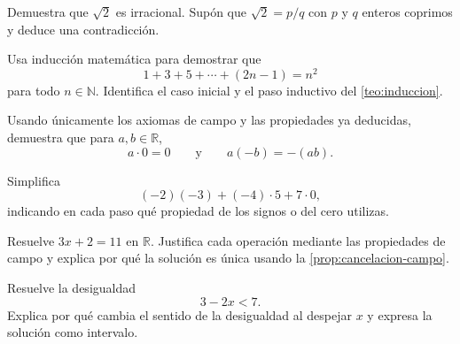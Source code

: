\begin{samepage}
\begin{problem}
Demuestra que $\sqrt2$ es irracional. Supón que $\sqrt2=p/q$ con $p$ y $q$ enteros coprimos y deduce una contradicción.
\end{problem}
\end{samepage}
\par{}

\begin{samepage}
\begin{problem}
Usa inducción matemática para demostrar que
\[
1+3+5+\cdots +(2n-1)=n^2
\]
para todo $n\in\mathbb{N}$.
Identifica el caso inicial y el paso inductivo del \cref{teo:induccion}.
\end{problem}
\end{samepage}
\par{}

\begin{samepage}
\begin{problem}
Usando únicamente los axiomas de campo y las propiedades ya deducidas, demuestra que para $a,b\in\mathbb{R}$,
\[
a\cdot0=0
\qquad\text{y}\qquad
a(-b)=-(ab).
\]
\end{problem}
\end{samepage}
\par{}

\begin{samepage}
\begin{problem}
Simplifica
\[
(-2)(-3)+(-4)\cdot5+7\cdot0,
\]
indicando en cada paso qué propiedad de los signos o del cero utilizas.
\end{problem}
\end{samepage}
\par{}

\begin{samepage}
\begin{problem}
Resuelve $3x+2=11$ en $\mathbb{R}$. Justifica cada operación mediante las propiedades de campo y explica por qué la solución es única usando la \cref{prop:cancelacion-campo}.
\end{problem}
\end{samepage}
\par{}

\begin{samepage}
\begin{problem}
Resuelve la desigualdad
\[
3-2x<7.
\]
Explica por qué cambia el sentido de la desigualdad al despejar $x$ y expresa la solución como intervalo.
\end{problem}
\end{samepage}
\par{}

